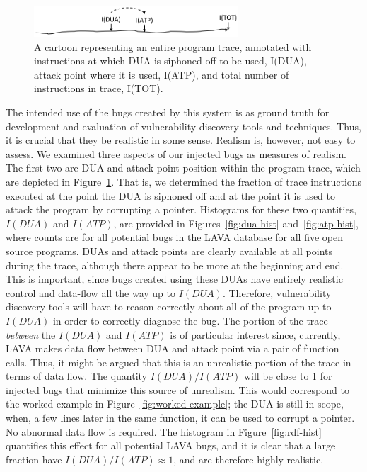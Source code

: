\begin{figure}
\centering
\includegraphics[width=3in]{trace-dua-atp.png}
\caption{A cartoon representing an entire program trace, annotated with instructions at which DUA is siphoned off to be used, I(DUA), attack point where it is used, I(ATP), and total number of instructions in trace, I(TOT).}
\label{fig:dua-atp-trace}
\end{figure}

The intended use of the bugs created by this system is as ground truth for development and evaluation of vulnerability discovery tools and techniques. 
Thus, it is crucial that they be realistic in some sense.  
Realism is, however, not easy to assess.
We examined three aspects of our injected bugs as measures of realism. 
The first two are DUA and attack point position within the program trace, which are depicted in Figure~\ref{fig:dua-atp-trace}.
That is, we determined the fraction of trace instructions executed at the point the DUA is siphoned off and at the point it is used to attack the program by corrupting a pointer.
Histograms for these two quantities, $I(DUA)$ and $I(ATP)$, are provided in Figures~\ref{fig:dua-hist} and~\ref{fig:atp-hist}, where counts are for all potential bugs in the LAVA database for all five open source programs. 
DUAs and attack points are clearly available at all points during the trace, although there appear to be more at the beginning and end.
This is important, since bugs created using these DUAs have entirely realistic control and data-flow all the way up to $I(DUA)$.
Therefore, vulnerability discovery tools will have to reason correctly about all of the program up to $I(DUA)$ in order to correctly diagnose the bug.
The portion of the trace \emph{between} the $I(DUA)$ and $I(ATP)$ is of particular interest since, currently, LAVA makes data flow between DUA and attack point via a pair of function calls.
Thus, it might be argued that this is an unrealistic portion of the trace in terms of data flow.
The quantity $I(DUA)/I(ATP)$ will be close to 1 for injected bugs that minimize this source of unrealism.
This would correspond to the worked example in Figure~\ref{fig:worked-example}; the DUA is still in scope, when, a few lines later in the same function, it can be used to corrupt a pointer.
No abnormal data flow is required.
The histogram in Figure~\ref{fig:rdf-hist} quantifies this effect for all potential LAVA bugs, and it is clear that a large fraction have $I(DUA)/I(ATP) \approx 1$, and are therefore highly realistic.


